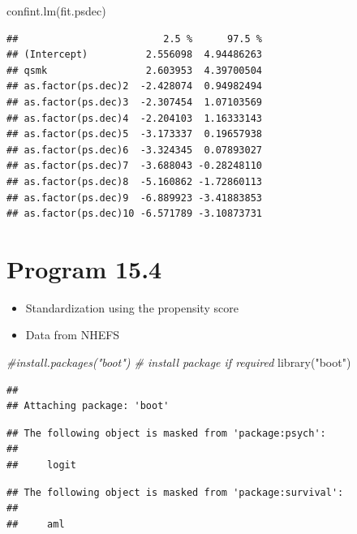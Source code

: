 \documentclass[
  10pt,
]{book}
\newenvironment{Shaded}{\begin{snugshade}}{\end{snugshade}}
\newcommand{\CommentTok}[1]{\textcolor[rgb]{0.56,0.35,0.01}{\textit{#1}}}
\newcommand{\FunctionTok}[1]{\textcolor[rgb]{0.00,0.00,0.00}{#1}}
\newcommand{\NormalTok}[1]{#1}
\newcommand{\StringTok}[1]{\textcolor[rgb]{0.31,0.60,0.02}{#1}}
\providecommand{\tightlist}{%
  \setlength{\itemsep}{0pt}\setlength{\parskip}{0pt}}
\begin{document}
\begin{Shaded}
\begin{Highlighting}[]
\FunctionTok{confint.lm}\NormalTok{(fit.psdec)}
\end{Highlighting}
\end{Shaded}

\begin{verbatim}
##                         2.5 %      97.5 %
## (Intercept)          2.556098  4.94486263
## qsmk                 2.603953  4.39700504
## as.factor(ps.dec)2  -2.428074  0.94982494
## as.factor(ps.dec)3  -2.307454  1.07103569
## as.factor(ps.dec)4  -2.204103  1.16333143
## as.factor(ps.dec)5  -3.173337  0.19657938
## as.factor(ps.dec)6  -3.324345  0.07893027
## as.factor(ps.dec)7  -3.688043 -0.28248110
## as.factor(ps.dec)8  -5.160862 -1.72860113
## as.factor(ps.dec)9  -6.889923 -3.41883853
## as.factor(ps.dec)10 -6.571789 -3.10873731
\end{verbatim}

\hypertarget{program-15.4}{%
\section{Program 15.4}\label{program-15.4}}

\begin{itemize}
\tightlist
\item
  Standardization using the propensity score
\item
  Data from NHEFS
\end{itemize}

\begin{Shaded}
\begin{Highlighting}[]
\CommentTok{\#install.packages("boot") \# install package if required}
\FunctionTok{library}\NormalTok{(}\StringTok{"boot"}\NormalTok{)}
\end{Highlighting}
\end{Shaded}

\begin{verbatim}
## 
## Attaching package: 'boot'
\end{verbatim}

\begin{verbatim}
## The following object is masked from 'package:psych':
## 
##     logit
\end{verbatim}

\begin{verbatim}
## The following object is masked from 'package:survival':
## 
##     aml
\end{verbatim}
\end{document}
